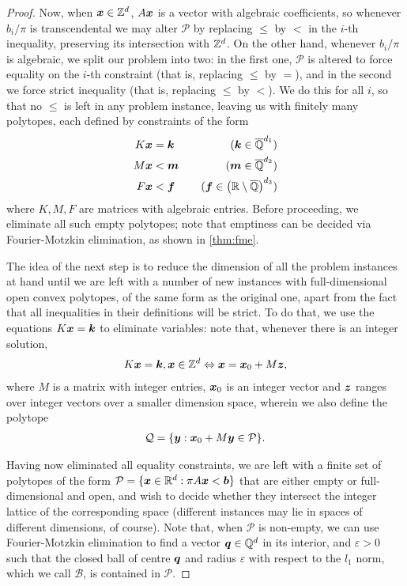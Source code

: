 \begin{proof}
Now, when $\boldsymbol{x} \in \mathbb{Z}^{d}$, $A \boldsymbol{x}$ is a vector with algebraic coefficients, so whenever $b_{i} / \pi$ is transcendental we may alter $\mathcal{P}$ by replacing $\leq$ by $<$ in the $i$-th inequality, preserving its intersection with $\mathbb{Z}^{d}$.
On the other hand, whenever $b_{i} / \pi$ is algebraic, we split our problem into two: in the first one, $\mathcal{P}$ is altered to force equality on the $i$-th constraint (that is, replacing $\leq$ by $=$), and in the second we force strict inequality (that is, replacing $\leq$ by $<$).
We do this for all $i$, so that no $\leq$ is left in any problem instance, leaving us with finitely many polytopes, each defined by constraints of the form
\begin{align*}
K \boldsymbol{x} &= \boldsymbol{k} \quad &(\boldsymbol{k} \in \overline{\mathbb{Q}}^{d_{1}}) \\
M \boldsymbol{x} &< \boldsymbol{m} \quad &(\boldsymbol{m} \in \overline{\mathbb{Q}}^{d_{2}}) \\
F \boldsymbol{x} &< \boldsymbol{f} \quad &(\boldsymbol{f} \in {\left(\mathbb{R}\setminus \overline{\mathbb{Q}}\right)}^{d_{3}})
\end{align*}
where $K,M,F$ are matrices with algebraic entries. Before proceeding, we eliminate all such empty polytopes; note that emptiness can be decided via Fourier-Motzkin elimination, as shown in \cref{thm:fme}.

The idea of the next step is to reduce the dimension of all the problem instances at hand until we are left with a number of new instances with full-dimensional open convex polytopes, of the same form as the original one, apart from the fact that all inequalities in their definitions will be strict. To do that, we use the equations $K \boldsymbol{x} = \boldsymbol{k}$ to eliminate variables: note that, whenever there is an integer solution,
\begin{align*}
K \boldsymbol{x} = \boldsymbol{k}, \boldsymbol{x} \in \mathbb{Z}^{d} \Leftrightarrow \boldsymbol{x} = \boldsymbol{x}_{0} + M \boldsymbol{z},
\end{align*}
where $M$ is a matrix with integer entries, $\boldsymbol{x}_{0}$ is an integer vector and $\boldsymbol{z}$ ranges over integer vectors over a smaller dimension space, wherein we also define the polytope
\begin{align*}
\mathcal{Q} = \lbrace \boldsymbol{y} : \boldsymbol{x}_{0} + M \boldsymbol{y} \in \mathcal{P} \rbrace .
\end{align*}

Having now eliminated all equality constraints, we are left with a finite set of polytopes of the form $\mathcal{P} = \lbrace \boldsymbol{x} \in \mathbb{R}^{d}: \pi A \boldsymbol{x} < \boldsymbol{b} \rbrace$ that are either empty or full-dimensional and open, and wish to decide whether they intersect the integer lattice of the corresponding space (different instances may lie in spaces of different dimensions, of course). Note that, when $\mathcal{P}$ is non-empty, we can use Fourier-Motzkin elimination to find a vector $\boldsymbol{q} \in \mathbb{Q}^{d}$ in its interior, and $\varepsilon > 0$ such that the closed ball of centre $\boldsymbol{q}$ and radius $\varepsilon$ with respect to the $l_{1}$ norm, which we call $\mathcal{B}$, is contained in $\mathcal{P}$.


\end{proof}
